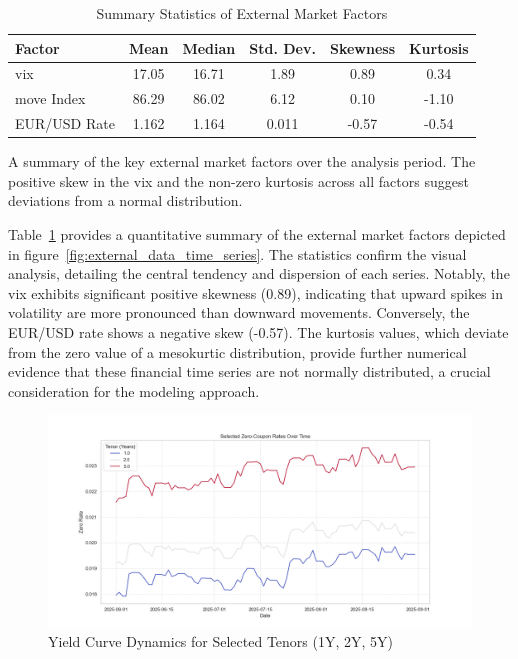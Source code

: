 \begin{table}[H]
	\centering
	\begin{threeparttable}
		\caption{Summary Statistics of External Market Factors}
		\label{tab:external_summary}
		\begin{tabular}{lccccc}
			\toprule
			\textbf{Factor} & \textbf{Mean} & \textbf{Median} & \textbf{Std. Dev.} & \textbf{Skewness} & \textbf{Kurtosis} \\
			\midrule
			\ac{vix}        & 17.05         & 16.71           & 1.89               & 0.89              & 0.34              \\
			\ac{move} Index & 86.29         & 86.02           & 6.12               & 0.10              & -1.10             \\
			EUR/USD Rate    & 1.162         & 1.164           & 0.011              & -0.57             & -0.54             \\
			\bottomrule
		\end{tabular}
		\begin{tablenotes}
			\footnotesize
			\item  A summary of the key external market factors over the analysis period. The positive skew in the \ac{vix} and the non-zero kurtosis across all factors suggest deviations from a normal distribution.
		\end{tablenotes}
	\end{threeparttable}
\end{table}


Table~\ref{tab:external_summary} provides a quantitative summary of the external market factors depicted in figure~\ref{fig:external_data_time_series}. The statistics confirm the visual analysis, detailing the central tendency and dispersion of each series. Notably, the \ac{vix} exhibits significant positive skewness (0.89), indicating that upward spikes in volatility are more pronounced than downward movements. Conversely, the EUR/USD rate shows a negative skew (-0.57). The kurtosis values, which deviate from the zero value of a mesokurtic distribution, provide further numerical evidence that these financial time series are not normally distributed, a crucial consideration for the modeling approach.

\begin{figure}[H]
	\centering
	\includegraphics[width=1\textwidth]{images/descriptive_data_analysis/yield_curve_selected_tenors.png}
	\caption{Yield Curve Dynamics for Selected Tenors (1Y, 2Y, 5Y)}
	\label{fig:yield_curve_selected_tenors}
\end{figure}

